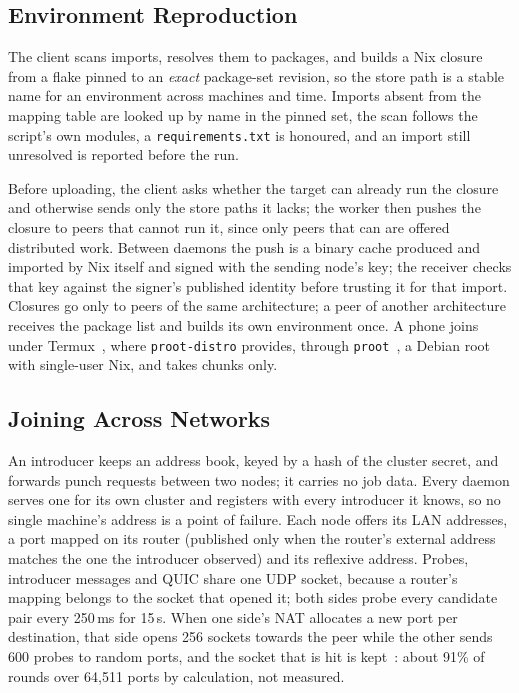 \documentclass[conference]{IEEEtran}
\begin{document}
\subsection{Environment Reproduction}
\label{sec:env}

The client scans imports, resolves them to packages, and builds a Nix closure
from a flake pinned to an \emph{exact} package-set revision, so the store path
is a stable name for an environment across machines and time. Imports absent
from the mapping table are looked up by name in the pinned set, the scan
follows the script's own modules, a \texttt{requirements.txt} is honoured, and
an import still unresolved is reported before the run.

Before uploading, the client asks whether the target can already run the
closure and otherwise sends only the store paths it lacks; the worker then
pushes the closure to peers that cannot run it, since only peers that can are
offered distributed work. Between daemons the push is a
binary cache produced and imported by Nix itself and signed with the sending
node's key; the receiver checks that key against the signer's published identity
before trusting it for that import. Closures go only to peers of the same
architecture; a peer of another architecture receives the package list and
builds its own environment once. A phone joins under Termux~\cite{termux}, where
\texttt{proot-distro} provides, through \texttt{proot}~\cite{proot}, a Debian
root with single-user Nix, and takes chunks only.

\subsection{Joining Across Networks}
\label{sec:nat}

An introducer keeps an address book, keyed by a hash of the cluster secret, and
forwards punch requests between two nodes; it carries no job data. Every daemon
serves one for its own cluster and registers with every introducer it knows, so
no single machine's address is a point of failure. Each node offers its LAN
addresses, a port mapped on its router (published only when the router's
external address matches the one the introducer observed) and its reflexive
address. Probes, introducer messages and QUIC share one UDP socket, because a
router's mapping belongs to the socket that opened it; both sides probe every
candidate pair every 250\,ms for 15\,s. When one side's NAT allocates a new port
per destination, that side opens 256 sockets towards the peer while the other
sends 600 probes to random ports, and the socket that is hit is
kept~\cite{anderson2020nat}: about 91\% of rounds over 64{,}511 ports by
calculation, not measured.
\end{document}
